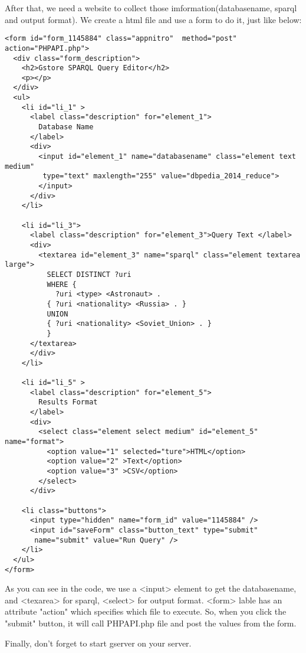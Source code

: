 \documentclass[titlepage, a4paper, 12pt]{article}
\begin{document}
	After that, we need a website to collect those imformation(databasename, sparql and output format). We create a html file and use a form to do it, just like below:
	\begin{verbatim}
<form id="form_1145884" class="appnitro"  method="post" action="PHPAPI.php">
  <div class="form_description">
    <h2>Gstore SPARQL Query Editor</h2>
    <p></p>
  </div>						
  <ul>
    <li id="li_1" >
      <label class="description" for="element_1">
        Database Name 
      </label>
      <div>
        <input id="element_1" name="databasename" class="element text medium" 
         type="text" maxlength="255" value="dbpedia_2014_reduce">
        </input>
      </div> 
    </li>		

    <li id="li_3">
      <label class="description" for="element_3">Query Text </label>
      <div>
        <textarea id="element_3" name="sparql" class="element textarea large">
          SELECT DISTINCT ?uri 
          WHERE { 
            ?uri <type> <Astronaut> . 
          { ?uri <nationality> <Russia> . } 
          UNION 
          { ?uri <nationality> <Soviet_Union> . } 
          } 
      </textarea> 
      </div> 
    </li>		

    <li id="li_5" >
      <label class="description" for="element_5">
        Results Format 
      </label>
      <div>
        <select class="element select medium" id="element_5" name="format"> 
          <option value="1" selected="ture">HTML</option>
          <option value="2" >Text</option>
          <option value="3" >CSV</option>
        </select>
      </div> 

    <li class="buttons">
      <input type="hidden" name="form_id" value="1145884" />
      <input id="saveForm" class="button_text" type="submit" 
       name="submit" value="Run Query" />
    </li>
  </ul>
</form>
	\end{verbatim}
	
	As you can see in the code, we use a <input> element to get the databasename, and <texarea> for sparql, <select> for output format. <form> lable has an attribute "action" which specifies which file to execute. So, when you click the "submit" button, it will call PHPAPI.php file and post the values from the form. 

	Finally, don't forget to start gserver on your server.
	
	\clearpage


\end{document}
